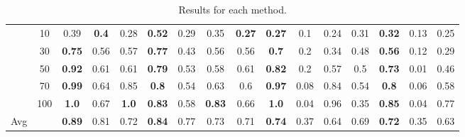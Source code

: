 \documentclass[letterpaper]{article}
\begin{document}
\begin{table*}[]
\begin{tabular}{cc|ccc|ccc|cccc|cccc}
 & 10 & 0.39 & \textbf{0.4} & 0.28 & \textbf{0.52} & 0.29 & 0.35 & \textbf{0.27} & \textbf{0.27} & 0.1 & 0.24 & 0.31 & \textbf{0.32} & 0.13 & 0.25\\ & 30 & \textbf{0.75} & 0.56 & 0.57 & \textbf{0.77} & 0.43 & 0.56 & 0.56 & \textbf{0.7} & 0.2 & 0.34 & 0.48 & \textbf{0.56} & 0.12 & 0.29\\ & 50 & \textbf{0.92} & 0.61 & 0.61 & \textbf{0.79} & 0.53 & 0.58 & 0.61 & \textbf{0.82} & 0.2 & 0.57 & 0.5 & \textbf{0.73} & 0.01 & 0.46\\ & 70 & \textbf{0.99} & 0.64 & 0.85 & \textbf{0.8} & 0.54 & 0.63 & 0.6 & \textbf{0.97} & 0.08 & 0.84 & 0.54 & \textbf{0.8} & 0.06 & 0.58\\ & 100 & \textbf{1.0} & 0.67 & \textbf{1.0} & \textbf{0.83} & 0.58 & \textbf{0.83} & 0.66 & \textbf{1.0} & 0.04 & 0.96 & 0.35 & \textbf{0.85} & 0.04 & 0.77\\\hline
Avg &  & \textbf{0.89} & 0.81 & 0.72 & \textbf{0.84} & 0.77 & 0.73 & 0.71 & \textbf{0.74} & 0.37 & 0.64 & 0.69 & \textbf{0.72} & 0.35 & 0.63\\
\bottomrule
\end{tabular}\\
\caption{Results for each method.}
\end{table*}
\end{document}
